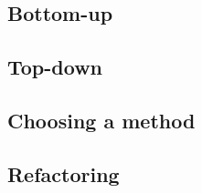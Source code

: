 

\subsection{Bottom-up}


\subsection{Top-down}
\label{topdownconcepts}


\subsection{Choosing a method}


\subsection{Refactoring \gdcases{}}



